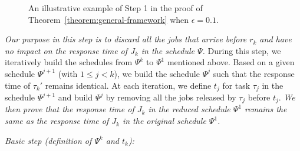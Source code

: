  


\begin{figure*}[t]
  \centering
\caption{An illustrative example of Step 1 in the proof of Theorem~\ref{theorem:general-framework} when $\epsilon = 0.1$.}
\label{fig:example}  
\end{figure*}



\emph{Our purpose in this step is to discard all the jobs that arrive before $r_k$ and have no impact on the response time of $J_k$ in the schedule
  $\Psi$. } During this step, we iteratively build the schedules from $\Psi^k$ to $\Psi^1$ mentioned above. Based on a given schedule $\Psi^{j+1}$ (with $1 \leq j < k$), we build the schedule $\Psi^j$ such that the response time of $\tau_{k}'$ remains identical. At each iteration, we define $t_j$ for task $\tau_j$ in the schedule $\Psi^{j+1}$ and build $\Psi^j$ by removing all the jobs released by $\tau_j$ before $t_j$. \emph{We then prove that the response time of $J_k$ in the reduced schedule $\Psi^1$ remains the same as the response time of $J_k$ in  the original schedule $\Psi^1$.}


\noindent\textit{Basic step (definition of $\Psi^k$ and $t_k$):} 

